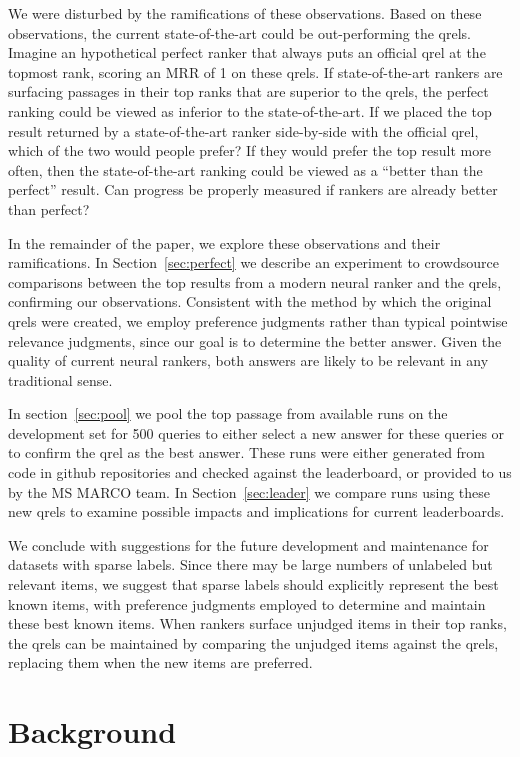 \documentclass[fullpage]{article}
\begin{document}
We were disturbed by the ramifications of these observations.
Based on these observations,
the current state-of-the-art could be out-performing the qrels.
Imagine an hypothetical perfect ranker that always puts an official qrel at the
topmost rank, scoring an MRR of 1 on these qrels.
If state-of-the-art rankers are surfacing passages in their top ranks that are
superior to the qrels,
the perfect ranking could be viewed as inferior to the state-of-the-art.
If we placed the top result returned by a state-of-the-art ranker side-by-side with the official qrel, which of the two would people prefer? If they would prefer the top result more often, then the state-of-the-art ranking could be viewed as a ``better than the perfect'' result. Can progress be properly measured if rankers are already better than perfect?

In the remainder of the paper, we explore these observations and their ramifications. In Section~\ref{sec:perfect} we describe an experiment to crowdsource comparisons between the top results from a modern neural ranker and the qrels, confirming our observations. Consistent with the method by which the original qrels were created, we employ preference judgments rather than typical pointwise relevance judgments, since our goal is to determine the better answer. Given the quality of current neural rankers, both answers are likely to be relevant in any traditional sense.

In section~\ref{sec:pool} we pool the top passage from available runs on the development set for 500 queries to either select a new answer for these queries or to confirm the qrel as the best answer. These runs were either generated from code in github repositories and checked against the leaderboard, or provided to us by the MS MARCO team. In Section~\ref{sec:leader} we compare runs using these new qrels to examine possible impacts and implications for current leaderboards.

We conclude with suggestions for the future development and maintenance for
datasets with sparse labels.
Since there may be large numbers of unlabeled but relevant items,
we suggest that sparse labels should explicitly represent the best known items,
with preference judgments employed to determine and maintain these best known items.
When rankers surface unjudged items in their top ranks, the qrels can be maintained by
comparing the unjudged items against the qrels, replacing them when the new items are
preferred.

\section{Background}
\end{document}
